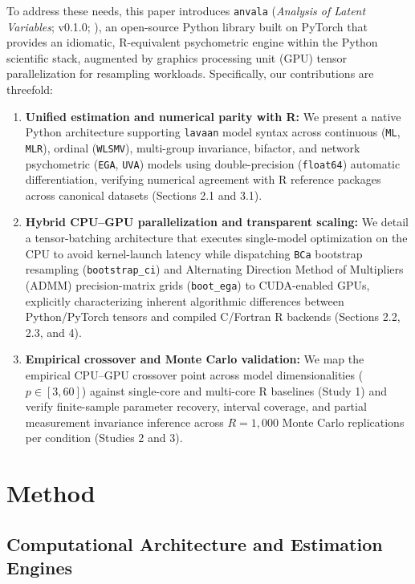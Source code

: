 ﻿\documentclass[12pt,letterpaper]{article}
\begin{document}
To address these needs, this paper introduces \texttt{anvala} (\textit{Analysis of Latent Variables}; v0.1.0; \parencite{pedrosa2026}), an open-source Python library built on PyTorch \parencite{paszke2019} that provides an idiomatic, R-equivalent psychometric engine within the Python scientific stack, augmented by graphics processing unit (GPU) tensor parallelization for resampling workloads. Specifically, our contributions are threefold:
\begin{enumerate}
    \item \textbf{Unified estimation and numerical parity with R:} We present a native Python architecture supporting \texttt{lavaan} model syntax across continuous (\texttt{ML}, \texttt{MLR}), ordinal (\texttt{WLSMV}), multi-group invariance, bifactor, and network psychometric (\texttt{EGA}, \texttt{UVA}) models using double-precision (\texttt{float64}) automatic differentiation, verifying numerical agreement with R reference packages across canonical datasets (Sections 2.1 and 3.1).
    \item \textbf{Hybrid CPU--GPU parallelization and transparent scaling:} We detail a tensor-batching architecture that executes single-model optimization on the CPU to avoid kernel-launch latency while dispatching \texttt{BCa} bootstrap resampling (\texttt{bootstrap\_ci}) and Alternating Direction Method of Multipliers (ADMM) precision-matrix grids (\texttt{boot\_ega}) to CUDA-enabled GPUs, explicitly characterizing inherent algorithmic differences between Python/PyTorch tensors and compiled C/Fortran R backends (Sections 2.2, 2.3, and 4).
    \item \textbf{Empirical crossover and Monte Carlo validation:} We map the empirical CPU--GPU crossover point across model dimensionalities ($p \in [3, 60]$) against single-core and multi-core R baselines (Study 1) and verify finite-sample parameter recovery, interval coverage, and partial measurement invariance inference across $R = 1{,}000$ Monte Carlo replications per condition (Studies 2 and 3).
\end{enumerate}

\section{Method}

\subsection{Computational Architecture and Estimation Engines}
\end{document}
